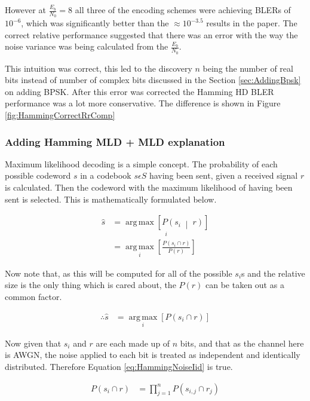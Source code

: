 \documentclass[12pt,onecolumn,letterpaper]{article}
\DeclareMathOperator*{\argmax}{arg\,max}
\begin{document}
However at $\frac{E_b}{N_0} = 8$ all three of the encoding schemes were achieving BLERs of $10^{-6}$, which was significantly better than the $\approx10^{-3.5}$ results in the paper. The correct relative performance suggested that there was an error with the way the noise variance was being calculated from the $\frac{E_b}{N_0}$.

This intuition was correct, this led to the discovery $n$ being the number of real bits instead of number of complex bits discussed in the Section \ref{sec:AddingBpsk} on adding BPSK. After this error was corrected the Hamming HD BLER performance was a lot more conservative. The difference is shown in Figure \ref{fig:HammingCorrectRrComp}

\subsubsection{Adding Hamming MLD + MLD explanation}

Maximum likelihood decoding is a simple concept. The probability of each possible codeword $s$ in a codebook $s\epsilon S$ having been sent, given a received signal $r$ is calculated. Then the codeword with the maximum likelihood of having been sent is selected. This is mathematically formulated below.

\begin{align}
   \hat{s} &= \underset{i}{\argmax\left[P\left(s_i\;\middle|\;r\right)\right]} \\
    &= \underset{i}{\argmax}\left[\frac{P\left(s_i\cap r\right)}{P\left(r\right)}\right]
\end{align}

Now note that, as this will be computed for all of the possible $s_i$s and the relative size is the only thing which is cared about, the $P\left(r\right)$ can be taken out as a common factor.

\begin{align}
   \therefore \hat{s} &= \underset{i}{\argmax}\left[P\left(s_i\cap r\right)\right] \nonumber
\end{align}

Now given that $s_i$ and $r$ are each made up of $n$ bits, and that as the channel here is AWGN, the noise applied to each bit is treated as independent and identically distributed. Therefore Equation \ref{eq:HammingNoiseIid} is true.

\begin{align}
   P\left(s_i\cap r\right) &= \prod_{j=1}^{n} P\left(s_{i,j}\cap r_j\right)
   \label{eq:HammingNoiseIid}
\end{align}
\end{document}
